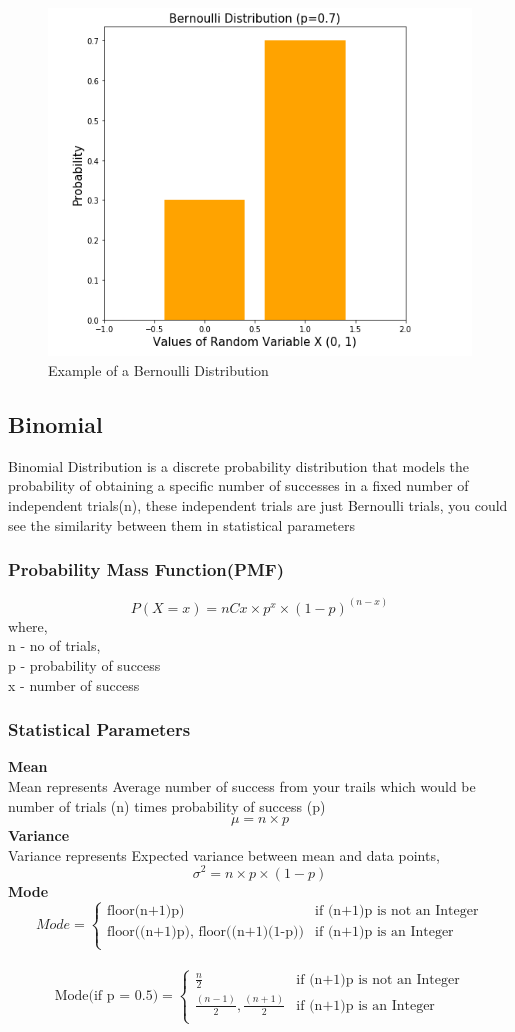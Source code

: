 \documentclass[12pt]{extarticle}
\begin{document}
\begin{figure}[H]
    \centering
    \includegraphics[width=0.5\linewidth]{images/bernoulli_example.png}
    \caption{Example of a Bernoulli Distribution}
    \label{fig:enter-label}
\end{figure}

\subsection{Binomial}
Binomial Distribution is a discrete probability distribution that models the probability of obtaining a specific number of successes
in a fixed number of independent trials(n), these independent trials are just Bernoulli trials, you could see the similarity between
them in statistical parameters

\subsubsection{Probability Mass Function(PMF)}

$$ P(X=x) = nCx \times p^x \times (1-p)^{(n-x)} $$
where,\\
n - no of trials,\\ 
p - probability of success\\
x - number of success\\

\subsubsection{Statistical Parameters}
\textbf{Mean}\\
Mean represents Average number of success from your trails which would be number of trials (n) times probability of success (p)
$$ \mu = n \times p $$
\textbf{Variance}\\
Variance represents Expected variance between mean and data points,
$$ \sigma^2 = n \times p \times (1-p) $$
\textbf{Mode}\\
$$ Mode = 
\begin{cases}
  \text{floor(n+1)p)} & \text{if (n+1)p is not an Integer} \\
  \text{floor((n+1)p), floor((n+1)(1-p))} & \text{if (n+1)p is an Integer} \\
\end{cases}$$ \\
$$ \text{Mode(if p = 0.5)} = 
\begin{cases}
  \frac{n}{2} & \text{if (n+1)p is not an Integer} \\
  \frac{(n-1)}{2},\frac{(n+1)}{2} & \text{if (n+1)p is an Integer} \\
\end{cases}
$$
\end{document}
